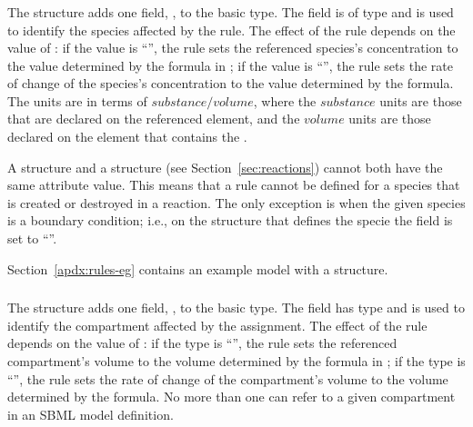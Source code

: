 \documentclass[10pt,twocolumntoc]{cekarticle}
\begin{document}
\subsubsection{}

The  structure adds one field,
, to the basic  type.  The field
 is of type  and is used to identify the species
affected by the rule.  The effect of the rule depends on the value of
: if the value is ``'', the rule sets the
referenced species's concentration to the value determined by the formula
in ; if the value is ``'', the rule sets the rate
of change of the species's concentration to the value determined by the
formula.  The units are in terms of $substance/volume$, where the
$substance$ units are those that are declared on the referenced
 element, and the $volume$ units are those declared on the
 element that contains the .

A  structure and a
 structure (see
Section~\ref{sec:reactions}) cannot both have the same 
attribute value.  This means that a rule cannot be defined for a
species that is created or destroyed in a reaction.  The only
exception is when the given species is a boundary condition; i.e.,
on the  structure that defines the specie the
 field is set to ``''.

Section~\ref{apdx:rules-eg} contains an example model with a
 structure.

\subsubsection{}

The  structure adds one field,
, to the basic  type.  The field
 has type  and is used to identify the
compartment affected by the assignment.  The effect of the rule depends on
the value of : if the type is ``'', the rule
sets the referenced compartment's volume to the volume determined by the
formula in ; if the type is ``'', the rule sets
the rate of change of the compartment's volume to the volume determined by
the formula.  No more than one  can refer to a
given compartment in an SBML model definition.
\end{document}
